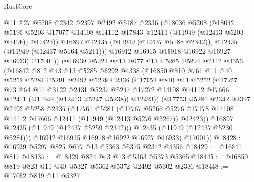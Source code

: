 \begin{lexlean}{RustCore}
\begin{coremodule}
                @11
                @27
                @5208
                @2342
                @2397
                @2492
                @5187
                @2336
                (@18036
                  @5208
                  (@18042
                    @5195
                    @5203
                    @17077
                    @14108
                    @14112
                    @17843
                    @12411
                    (@11949 (@12413 @5203 @5196))
                    @12423))
                @16897
                @12435
                (@11949 (@12437 @5188 @2342)))
              @12435
              (@11949 (@12437 @5164 @5211)))
            @16912
            @16915
            @16918
            @16922
            @16927
            @16933)
          @17001))
      (@16939
        @5224
        @813
        @677
        @13
        @5285
        @5294
        @2342
        @4356
        (@16842
          @812
          @43
          @13
          @5285
          @5292
          @4338
          (@16850
            @810
            @761
            @11
            @40
            @5252
            @5284
            @5291
            @2492
            @5229
            @2336
            (@17052
              @810
              @11
              @5252
              (@17257
                @73
                @64
                @11
                @3122
                @2431
                @5237
                @5247
                @17272
                @14108
                @14112
                @17666
                @12411
                (@11949 (@12413 @5247 @5238))
                @12423))
            (@17753
              @5281
              @2342
              @2397
              @2492
              @5258
              @2336
              (@17761
                @5281
                (@17767
                  @5266
                  @5276
                  @17178
                  @14108
                  @14112
                  @17666
                  @12411
                  (@11949 (@12413 @5276 @5267))
                  @12423))
              @16897
              @12435
              (@11949 (@12437 @5259 @2342)))
            @12435
            (@11949 (@12437 @5230 @5284)))
          @16912
          @16915
          @16918
          @16922
          @16927
          @16933)
        @17001))
@18428 := @16939 @5297 @825 @677 @13 @5363 @5375 @2342 @4356
@18429 := @16841 @817
@18435 := @18429 @824 @43 @13 @5363 @5373 @5365
@18445 := @16850 @819 @823 @11 @40 @5327 @5362 @5372 @2492 @5302 @2336
@18448 := @17052 @819 @11 @5327

\end{coremodule}
\end{lexlean}
